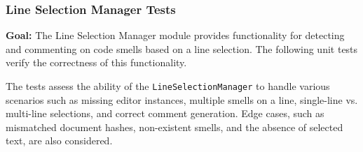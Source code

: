 \documentclass[12pt, titlepage]{article}
\begin{document}
\subsubsection{Line Selection Manager Tests}

\textbf{Goal:} The Line Selection Manager module provides functionality for detecting and commenting on code smells based on a line selection. The following unit tests verify the correctness of this functionality.

The tests assess the ability of the \texttt{LineSelectionManager} to handle various scenarios such as missing editor instances, multiple smells on a line, single-line vs. multi-line selections, and correct comment generation. Edge cases, such as mismatched document hashes, non-existent smells, and the absence of selected text, are also considered.
\end{document}

